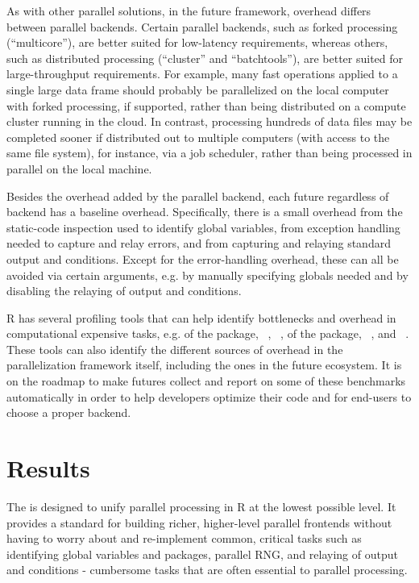 As with other parallel solutions, in the future framework, overhead
differs between parallel backends.  Certain parallel backends, such as
forked processing (``multicore''), are better suited for low-latency
requirements, whereas others, such as distributed processing
(``cluster'' and ``batchtools''), are better suited for
large-throughput requirements.  For example, many fast operations
applied to a single large data frame should probably be parallelized
on the local computer with forked processing, if supported, rather
than being distributed on a compute cluster running in the cloud.  In
contrast, processing hundreds of data files may be completed sooner if
distributed out to multiple computers (with access to the same file
system), for instance, via a job scheduler, rather than being processed
in parallel on the local machine.

Besides the overhead added by the parallel backend, each future
regardless of backend has a baseline overhead.  Specifically, there is
a small overhead from the static-code inspection used to identify
global variables, from exception handling needed to capture and relay
errors, and from capturing and relaying standard output and
conditions.  Except for the error-handling overhead, these can all be
avoided via certain  arguments, e.g. by manually
specifying globals needed and by disabling the relaying of output and
conditions.

R has several profiling tools that can help identify bottlenecks and
overhead in computational expensive tasks, e.g. 
of the  package,
~\citep{CRAN:microbenchmark},
~\citep{CRAN:bench},
 of the  package,
~\citep{CRAN:proffer}, and
~\citep{CRAN:profvis}.  These tools can also identify
the different sources of overhead in the parallelization framework
itself, including the ones in the future ecosystem.  It is on the
roadmap to make futures collect and report on some of these benchmarks
automatically in order to help developers optimize their code and for
end-users to choose a proper backend.


\section{Results}
\label{results}

The  is designed to unify parallel processing in R at
the lowest possible level.  It provides a standard for building
richer, higher-level parallel frontends without having to worry about
and re-implement common, critical tasks such as identifying global
variables and packages, parallel RNG, and relaying of output and
conditions - cumbersome tasks that are often essential to parallel
processing.

